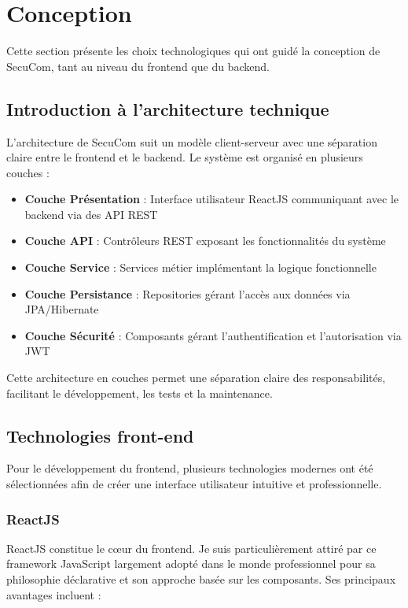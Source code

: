 \chapter{Conception}

Cette section présente les choix technologiques qui ont guidé la conception de SecuCom, tant au niveau du frontend que du backend.

\section{Introduction à l'architecture technique}

L'architecture de SecuCom suit un modèle client-serveur avec une séparation claire entre le frontend et le backend. Le système est organisé en plusieurs couches :

\begin{itemize}
  \item \textbf{Couche Présentation} : Interface utilisateur ReactJS communiquant avec le backend via des API REST
  \item \textbf{Couche API} : Contrôleurs REST exposant les fonctionnalités du système
  \item \textbf{Couche Service} : Services métier implémentant la logique fonctionnelle
  \item \textbf{Couche Persistance} : Repositories gérant l'accès aux données via JPA/Hibernate
  \item \textbf{Couche Sécurité} : Composants gérant l'authentification et l'autorisation via JWT
\end{itemize}

Cette architecture en couches permet une séparation claire des responsabilités, facilitant le développement, les tests et la maintenance.

\section{Technologies front-end}

Pour le développement du frontend, plusieurs technologies modernes ont été sélectionnées afin de créer une interface utilisateur intuitive et professionnelle.

\subsection{ReactJS}

ReactJS constitue le cœur du frontend. Je suis particulièrement attiré par ce framework JavaScript largement adopté dans le monde professionnel pour sa philosophie déclarative et son approche basée sur les composants. Ses principaux avantages incluent :

